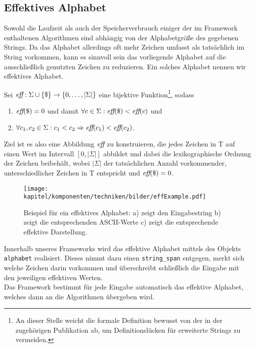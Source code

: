 \subsection{Effektives Alphabet}
\label{section:effalphabet}
Sowohl  die Laufzeit als auch der Speicherverbrauch einiger der im Framework enthaltenen Algorithmen sind abhängig von der Alphabetgröße des gegebenen Strings. Da das Alphabet allerdings oft mehr Zeichen umfasst als tatsächlich im String vorkommen, kann es sinnvoll sein das vorliegende Alphabet auf die ausschließlich genutzten Zeichen zu reduzieren. Ein solches Alphabet nennen wir effektives Alphabet.\par
\begin{definition}
	\label{def:effective_alphabet}
	Sei \(\textit{eff} : \Sigma \cup \{\$\} \rightarrow \{0, \ldots, |\Sigma|\}\) eine bijektive Funktion\footnote{\label{differs_from_paper}An dieser Stelle weicht die formale Definition bewusst von der in der zugehörigen Publikation \cite{schuermann2005} ab, um Definitionslücken für erweiterte Strings zu vermeiden.}, sodass
	\begin{enumerate}
		\item \(\textit{eff}(\$) = 0\) \quad und damit \(\forall c \in \Sigma : \textit{eff}(\$) < \textit{eff}(c)\) und
		\item \(\forall c_1, c_2 \in \Sigma : c_1 < c_2 \Rightarrow \textit{eff}(c_1) < \textit{eff}(c_2)\).
	\end{enumerate}
\end{definition}
Ziel ist es also eine Abbildung $\textit{eff}$ zu konstruieren, die jedes Zeichen in T auf einen Wert im Intervall $[0,|\Sigma|]$ abbildet und dabei die lexikographische Ordnung der Zeichen beibehält, wobei $|\Sigma|$ der tatsächlichen Anzahl vorkommender, unterschiedlicher Zeichen in T entspricht und $\textit{eff}(\$)=0$.\\

\begin{figure}[h]
\centering
\texttt{[image: kapitel/komponenten/techniken/bilder/effExample.pdf]}
\caption{Beispiel für ein effektives Alphabet: a) zeigt den Eingabestring b) zeigt die entsprechenden ASCII-Werte c) zeigt die entsprechende effektive Darstellung.}
\end{figure}
Innerhalb unseres Frameworks wird das effektive Alphabet mittels des Objekts \texttt{alphabet} realisiert. Dieses nimmt dazu einen \texttt{string_span} entgegen, merkt sich welche Zeichen darin vorkommen und überschreibt schließlich die Eingabe mit den jeweiligen effektiven Werten. \\
Das Framework bestimmt für jede Eingabe automatisch das effektive Alphabet, welches dann an die Algorithmen übergeben wird. 
